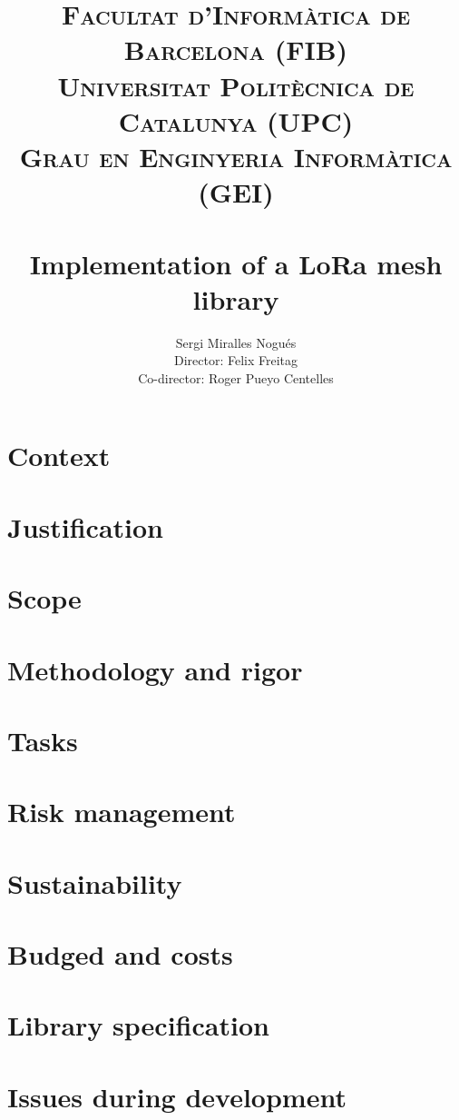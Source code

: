 \documentclass[11pt,a4paper,titlepage]{article}
\author{ \LARGE Sergi Miralles Nogués\vspace{4mm} \\ Director: Felix Freitag  \\ Co-director: Roger Pueyo Centelles}
\title{\vspace{-15mm}\textsc{\Large Facultat d'Informàtica de Barcelona (FIB)}\\\textsc{\Large Universitat Politècnica de Catalunya (UPC)\vspace{5mm}}\\\textsc{\large Grau en Enginyeria Informàtica (GEI)}\\\textsc{\large}\\{\vspace{30mm}\huge \bfseries \fontfamily{lmss}\selectfont Implementation of a LoRa mesh library}  \\ { \LARGE \textsc{}}}
\begin{document}
	\maketitle
    
    \tableofcontents
    
    \newpage
    
    \section{Context}
    
    \section{Justification}
    
    \section{Scope}
    
    \section{Methodology and rigor}
    
    \section{Tasks}
    
    \section{Risk management}
    
    \section{Sustainability}
    
    \section{Budged and costs}
    
    \section{Library specification}
    
    
    \section{Issues during development}
\end{document}
